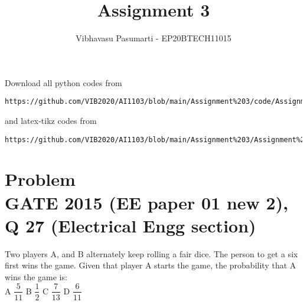 \documentclass[journal,12pt,twocolumn]{IEEEtran}
\theoremstyle{remark}
\numberwithin{equation}{subsection}
\renewcommand{\thefigure}{\theproblem}
\begin{document}
\title{Assignment 3}
\author{Vibhavasu Pasumarti - EP20BTECH11015}
\maketitle
\newpage
\bigskip
\renewcommand{\thefigure}{\theenumi}
\renewcommand{\thetable}{\theenumi}
Download all python codes from 
\begin{lstlisting}
https://github.com/VIB2020/AI1103/blob/main/Assignment%203/code/Assignment%203.py
\end{lstlisting}
%
and latex-tikz codes from 
%
\begin{lstlisting}
https://github.com/VIB2020/AI1103/blob/main/Assignment%203/Assignment%203.pdf
\end{lstlisting}
\section{\Large Problem \\ \large GATE 2015 (EE paper 01 new 2), Q 27 (Electrical Engg section)}
\onehalfspacing
Two players A, and B alternately keep rolling a fair dice. The person to get a six first wins the game. Given that player A starts the game, the probability that A wins the game is:\\[5pt]
    A $\dfrac{5}{11}$ \hspace{1cm}
    B $\dfrac{1}{2}$ \hspace{1cm}
    C $\dfrac{7}{13}$ \hspace{1cm}
    D $\dfrac{6}{11}$ \hspace{1cm}
\singlespacing
\end{document}
